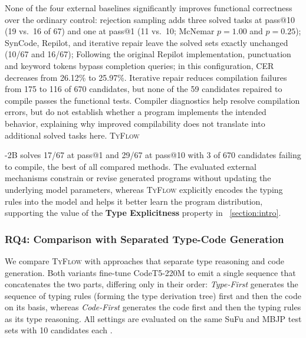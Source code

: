 \documentclass[manuscript,screen]{acmart}
\newcommand{\toolname}[1]{\textsc{#1}}
\newcommand{\mainname}{\toolname{TyFlow}\xspace}
\begin{document}
   {\color{revblue}None of the four external baselines significantly improves functional correctness over the ordinary control:
rejection sampling adds three solved tasks at pass@10 (19 vs.\ 16 of 67) and one at pass@1 (11 vs.\ 10; McNemar $p=1.00$ and $p=0.25$);
SynCode, Repilot, and iterative repair leave the solved sets exactly unchanged (10/67 and 16/67);
Following the original Repilot implementation, punctuation and keyword tokens bypass completion queries; in this configuration, CER decreases from 26.12\% to 25.97\%.
Iterative repair reduces compilation failures from 175 to 116 of 670 candidates, but none of the 59 candidates repaired to compile passes the functional tests. Compiler diagnostics help resolve compilation errors, but do not establish whether a program implements the intended behavior, explaining why improved compilability does not translate into additional solved tasks here.
} \mainname %

  {\color{revblue}-2B solves 17/67 at } pass@1 and  {\color{revblue}29/67 at } pass@10  %
  {\color{revblue}with 3 of 670 candidates failing to compile, the best of all compared methods.
The evaluated external mechanisms constrain or revise generated programs without updating the underlying model parameters, whereas }\mainname{} {\color{revblue}explicitly encodes the typing rules into the model and helps it better learn the program distribution, supporting the value of the } \textbf{Type Explicitness}    {\color{revblue}property in~} \autoref{section:intro}.

\subsubsection{RQ4: Comparison with Separated Type-Code Generation}
   {\color{revblue}We } compare \mainname with approaches that separate type reasoning and code generation.
   {\color{revblue}Both variants fine-tune } CodeT5-220M    {\color{revblue}to emit a single sequence that concatenates the two parts, differing only in their order: }\emph{\color{revblue}Type-First} {\color{revblue}generates the sequence } of typing rules (forming the type derivation tree)    {\color{revblue}first and then the code on its basis, whereas }\emph{\color{revblue}Code-First} {\color{revblue}generates the code first and then the } typing rules as its type  %
  {\color{revblue}reasoning.
All settings are evaluated on the same SuFu and MBJP test sets with 10 candidates each} .
\end{document}
